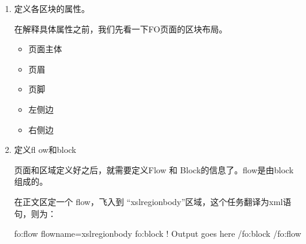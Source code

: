 \documentclass[letterpaper,10pt,english]{sphinxmanual}
\begin{document}
\begin{enumerate}
\sphinxAtStartPar
这里定义的就是竖版A4的样式。需要注意的是这里的A4只是一个名字，软件并不能通过A4这个名称就知道具体的定义，所以我们依然需要描述什么是竖版A4样式。A4纸的ISO 216的定义规格是29.7CM ×21.0CM，翻译为 xml 语句为：

\begin{sphinxVerbatim}[commandchars=\\\{\}]
page\PYGZhy{}height=\PYGZdq{}29.7cm\PYGZdq{}page\PYGZhy{}width=\PYGZdq{}21.0cm\PYGZdq{}
\end{sphinxVerbatim}

\item {} 
\sphinxAtStartPar
定义各区块的属性。

\sphinxAtStartPar
在解释具体属性之前，我们先看一下FO页面的区块布局。
\begin{itemize}
\item {} 
\sphinxAtStartPar
页面主体 

\item {} 
\sphinxAtStartPar
页眉

\item {} 
\sphinxAtStartPar
页脚

\item {} 
\sphinxAtStartPar
左侧边 

\item {} 
\sphinxAtStartPar
右侧边

\end{itemize}

\sphinxAtStartPar
{}

\item {} 
\sphinxAtStartPar
定义fl ow和block

\sphinxAtStartPar
页面和区域定义好之后，就需要定义Flow 和 Block的信息了。flow是由block组成的。

\sphinxAtStartPar
在正文区定一个 flow，飞入到 “xsl\sphinxhyphen{}region\sphinxhyphen{}body”区域，这个任务翻译为xml语句，则为：

\begin{sphinxVerbatim}[commandchars=\\\{\}]
    \PYGZlt{}fo:flow flow\PYGZhy{}name=\PYGZdq{}xsl\PYGZhy{}region\PYGZhy{}body\PYGZdq{}\PYGZgt{}
      \PYGZlt{}fo:block\PYGZgt{}
        \PYGZlt{}!\PYGZhy{}\PYGZhy{} Output goes here \PYGZhy{}\PYGZhy{}\PYGZgt{}
      \PYGZlt{}/fo:block\PYGZgt{}
    \PYGZlt{}/fo:flow\PYGZgt{}
\end{sphinxVerbatim}


\end{enumerate}
\end{document}
